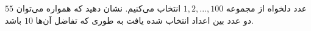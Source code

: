 \EXERCISE
$55$
عدد دلخواه از مجموعه
${1, 2, ..., 100}$
انتخاب می‌کنیم. نشان دهید که همواره می‌توان دو عدد بین اعداد انتخاب شده یافت به طوری که تفاضل آن‌ها
$10$
باشد.
